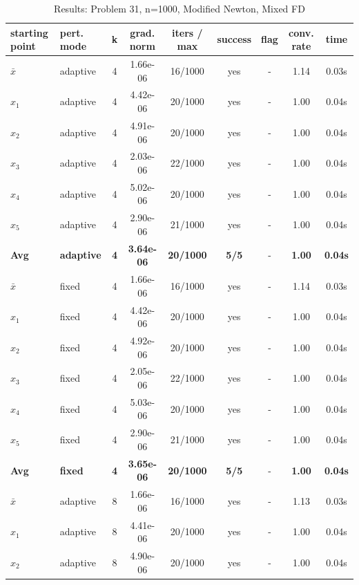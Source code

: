 \begin{longtable}{|l|l|c|c|c|c|c|c|c|}
\caption{Results: Problem 31, n=1000, Modified Newton, Mixed FD} \\
\hline
\textbf{starting point} & \textbf{pert. mode} & \textbf{k} & \textbf{grad. norm} & \textbf{iters / max} & \textbf{success} & \textbf{flag} & \textbf{conv. rate} & \textbf{time} \\
\hline
\endfirsthead
\endhead
\endfoot
\hline
\endlastfoot
$\bar{x}$ & adaptive & 4 & 1.66e-06 & 16/1000 & yes & - & 1.14 & 0.03s \\
\hline
$x_1$ & adaptive & 4 & 4.42e-06 & 20/1000 & yes & - & 1.00 & 0.04s \\
\hline
$x_2$ & adaptive & 4 & 4.91e-06 & 20/1000 & yes & - & 1.00 & 0.04s \\
\hline
$x_3$ & adaptive & 4 & 2.03e-06 & 22/1000 & yes & - & 1.00 & 0.04s \\
\hline
$x_4$ & adaptive & 4 & 5.02e-06 & 20/1000 & yes & - & 1.00 & 0.04s \\
\hline
$x_5$ & adaptive & 4 & 2.90e-06 & 21/1000 & yes & - & 1.00 & 0.04s \\
\hline
\hline\hline
\textbf{Avg} & \textbf{adaptive} & \textbf{4} & \textbf{3.64e-06} & \textbf{20/1000} & \textbf{5/5} & - & \textbf{1.00} & \textbf{0.04s} \\
\hline\hline
\hline
$\bar{x}$ & fixed & 4 & 1.66e-06 & 16/1000 & yes & - & 1.14 & 0.03s \\
\hline
$x_1$ & fixed & 4 & 4.42e-06 & 20/1000 & yes & - & 1.00 & 0.04s \\
\hline
$x_2$ & fixed & 4 & 4.92e-06 & 20/1000 & yes & - & 1.00 & 0.04s \\
\hline
$x_3$ & fixed & 4 & 2.05e-06 & 22/1000 & yes & - & 1.00 & 0.04s \\
\hline
$x_4$ & fixed & 4 & 5.03e-06 & 20/1000 & yes & - & 1.00 & 0.04s \\
\hline
$x_5$ & fixed & 4 & 2.90e-06 & 21/1000 & yes & - & 1.00 & 0.04s \\
\hline
\hline\hline
\textbf{Avg} & \textbf{fixed} & \textbf{4} & \textbf{3.65e-06} & \textbf{20/1000} & \textbf{5/5} & - & \textbf{1.00} & \textbf{0.04s} \\
\hline\hline
$\bar{x}$ & adaptive & 8 & 1.66e-06 & 16/1000 & yes & - & 1.13 & 0.03s \\
\hline
$x_1$ & adaptive & 8 & 4.41e-06 & 20/1000 & yes & - & 1.00 & 0.04s \\
\hline
$x_2$ & adaptive & 8 & 4.90e-06 & 20/1000 & yes & - & 1.00 & 0.04s \\

\end{longtable}
